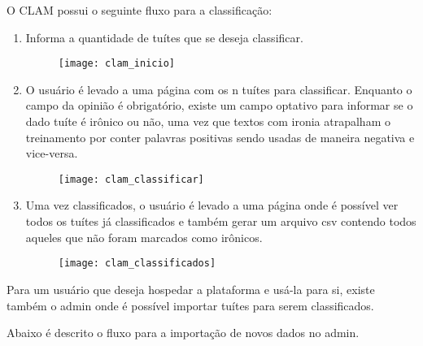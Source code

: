 O CLAM possui o seguinte fluxo para a classificação:

\begin{enumerate}
	\item Informa a quantidade de tuítes que se deseja classificar.
	\begin{figure}[H]
		\texttt{[image: clam\_inicio]}
	\end{figure}
	\item O usuário é levado a uma página com os n tuítes para classificar.
	Enquanto o campo da opinião é obrigatório, existe um campo optativo para informar
	se o dado tuíte é irônico ou não, uma vez que textos com ironia atrapalham
	o treinamento por conter palavras positivas sendo usadas de maneira negativa e vice-versa.
	\begin{figure}[H]
		\texttt{[image: clam\_classificar]}
	\end{figure}
	\item Uma vez classificados, o usuário é levado a uma página onde é possível ver todos
	os tuítes já classificados e também gerar um arquivo csv contendo todos aqueles
	que não foram marcados como irônicos.
	\begin{figure}[H]
		\texttt{[image: clam\_classificados]}
	\end{figure}
\end{enumerate}

Para um usuário que deseja hospedar a plataforma e usá-la para si, existe também o admin onde
é possível importar tuítes para serem classificados.

Abaixo é descrito o fluxo para a importação de novos dados no admin.

